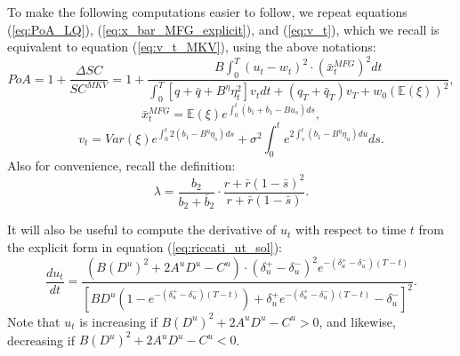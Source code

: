 \documentclass[11pt]{article}
\begin{document}
To make the following computations easier to follow, we repeat equations (\ref{eq:PoA_LQ}), (\ref{eq:x_bar_MFG_explicit}), and (\ref{eq:v_t}), which we recall is equivalent to  equation (\ref{eq:v_t_MKV}), using the above notations:
\begin{equation}
PoA =1+ \frac{\Delta SC}{SC^{MKV}}= 1 +  \frac{ \displaystyle B\int_0^T (u_t-w_t)^2 \cdot (\bar{x}_t^{MFG})^2 dt }{\displaystyle \int_0^T \left[q+\bar{q} + B^{\eta} \eta_t^2 \right] v_t dt + (q_T + \bar{q}_T) v_T + w_0 (\mathbb{E}(\xi))^2},
\label{eq:PoA_LQ_new_notation}
\end{equation}
\begin{equation}
\bar{x}^{MFG}_t=\mathbb{E}(\xi) e^{\int_0^t(b_1+\bar{b}_1-Bu_s)ds},
\label{eq:x_bar_MFG_explicit_new_notation}
\end{equation}
\begin{equation}
v_t=Var(\xi)e^{\int_0^t 2(b_1-B^{\eta} \eta_s)ds}+\sigma^2 \int_0^t e^{2 \int_s^t (b_1-B^{\eta}\eta_u) du}ds.
\label{eq:v_t_new_notation}
\end{equation}
Also for convenience, recall the definition:
\begin{equation*}
\lambda = \frac{b_2}{b_2 + \bar{b}_2}\cdot \frac{ r + \bar{r}(1-\bar{s})^2 }{r + \bar{r}(1-\bar{s})}.
\end{equation*}

It will also be useful to compute the derivative of $u_t$ with respect to time $t$ from the explicit form in equation (\ref{eq:riccati_ut_sol}):
\begin{equation}
\frac{d u_t}{dt} = \frac{\left(B (D^{u})^2 + 2 A^u D^{u} - C^{u} \right) \cdot \left(\delta_u^{+} - \delta_u^{-}\right)^2 e^{- (\delta_u^{+} - \delta_u^{-})(T-t) } }{\left[B D^{u}(1-e^{- (\delta_u^{+} - \delta_u^{-})(T-t)})   + \delta_u^{+}e^{- (\delta_u^{+} - \delta_u^{-})(T-t)}- \delta_u^{-}  \right]^2 }.
\label{eq:riccati_ut_sol_deriv}
\end{equation}
Note that $u_t$ is increasing if $B (D^{u})^2 + 2 A^u D^{u} - C^{u}>0$, and likewise, decreasing if $B (D^{u})^2 + 2 A^u D^{u} - C^{u}<0$.
\end{document}
